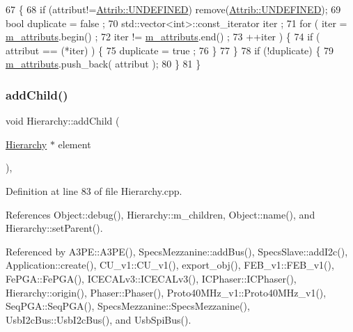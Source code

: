 \begin{DoxyCode}
67                             \{
68     \textcolor{keywordflow}{if} (attribut!=\hyperlink{classAttrib_a69e171d7cc6417835a5a306d3c764235a3a8da2ab97dda18aebab196fe4100531}{Attrib::UNDEFINED}) \textcolor{keyword}{remove}(\hyperlink{classAttrib_a69e171d7cc6417835a5a306d3c764235a3a8da2ab97dda18aebab196fe4100531}{Attrib::UNDEFINED});
69     \textcolor{keywordtype}{bool} duplicate = false ;
70     std::vector<int>::const\_iterator iter ;
71     \textcolor{keywordflow}{for} ( iter  = \hyperlink{classAttrib_ac4bd58a0cc6b38a3b711d609a3d3aacc}{m\_attributs}.begin() ;
72           iter != \hyperlink{classAttrib_ac4bd58a0cc6b38a3b711d609a3d3aacc}{m\_attributs}.end()   ;
73           ++iter ) \{
74       \textcolor{keywordflow}{if} ( attribut == (*iter) ) \{
75         duplicate = true ;
76       \}
77     \}
78     \textcolor{keywordflow}{if} (!duplicate) \{
79       \hyperlink{classAttrib_ac4bd58a0cc6b38a3b711d609a3d3aacc}{m\_attributs}.push\_back( attribut );
80     \}
81   \}
\end{DoxyCode}
\mbox{\label{classHierarchy_ad677774ff38fcb257c04a3a10d471fac}} 
\subsubsection{\texorpdfstring{add\+Child()}{addChild()}}
{\footnotesize\ttfamily void Hierarchy\+::add\+Child (\begin{DoxyParamCaption}\item[{\hyperlink{classHierarchy}{Hierarchy} $\ast$}]{element }\end{DoxyParamCaption})\hspace{0.3cm}{\ttfamily [virtual]}, {\ttfamily [inherited]}}



Definition at line 83 of file Hierarchy.\+cpp.



References Object\+::debug(), Hierarchy\+::m\+\_\+children, Object\+::name(), and Hierarchy\+::set\+Parent().



Referenced by A3\+P\+E\+::\+A3\+P\+E(), Specs\+Mezzanine\+::add\+Bus(), Specs\+Slave\+::add\+I2c(), Application\+::create(), C\+U\+\_\+v1\+::\+C\+U\+\_\+v1(), export\+\_\+obj(), F\+E\+B\+\_\+v1\+::\+F\+E\+B\+\_\+v1(), Fe\+P\+G\+A\+::\+Fe\+P\+G\+A(), I\+C\+E\+C\+A\+Lv3\+::\+I\+C\+E\+C\+A\+Lv3(), I\+C\+Phaser\+::\+I\+C\+Phaser(), Hierarchy\+::origin(), Phaser\+::\+Phaser(), Proto40\+M\+Hz\+\_\+v1\+::\+Proto40\+M\+Hz\+\_\+v1(), Seq\+P\+G\+A\+::\+Seq\+P\+G\+A(), Specs\+Mezzanine\+::\+Specs\+Mezzanine(), Usb\+I2c\+Bus\+::\+Usb\+I2c\+Bus(), and Usb\+Spi\+Bus().


